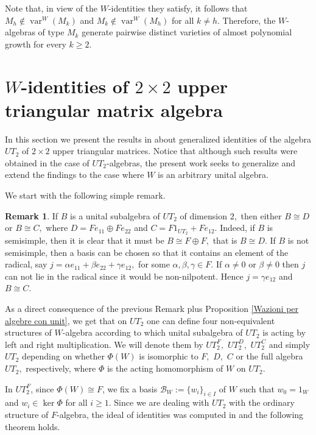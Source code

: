 \documentclass[reqno]{amsart}
\theoremstyle{definition}
\newtheorem{remark}[theorem]{Remark}
\numberwithin{equation}{section}
\numberwithin{theorem}{section}
\DeclareMathOperator{\V}{var}
\begin{document}
Note that, in view of the $W$-identities they satisfy, it follows that $M_h\notin\V^W(M_k)$ and $M_k\notin\V^W(M_h)$ for all $k\neq h.$ Therefore, the $W$-algebras of type $M_k$ generate pairwise distinct varieties of almost polynomial growth for every $k\geq 2.$


\section{$W$-identities of $2\times 2$ upper triangular matrix algebra}
In this section we present the results in \cite{MartinoRizzo2024} about generalized identities of the algebra $UT_2$ of $2 \times 2$ upper triangular matrices. Notice that although such results were obtained in the case of $UT_2$-algebras, the present work seeks to generalize and extend the findings to the case where $W$ is an arbitrary unital algebra. 

We start with the following simple remark.

\begin{remark}\label{sottoalgebre di dimensione 2}
If $B$ is a unital subalgebra of $UT_2$ of dimension $2,$ then either $B\cong D$ or $B\cong C,$ where $D=Fe_{11}\oplus Fe_{22}$ and $C=F 1_{UT_2}+ Fe_{12}.$ Indeed, if $B$ is semisimple, then it is clear that it must be $B\cong F\oplus F,$ that is $B\cong D.$ If $B$ is not semisimple, then a basis can be chosen so that it contains an element of the radical, say $j=\alpha e_{11}+\beta e_{22}+\gamma e_{12},$ for some $\alpha,\beta,\gamma\in F.$ If $\alpha\neq 0$ or $\beta\neq 0$ then $j$ can not lie in the radical since it would be non-nilpotent. Hence $j=\gamma e_{12}$ and $B\cong C.$
\end{remark}

As a direct consequence of the previous Remark plus Proposition \ref{Wazioni per algebre con unit}, we get that on $UT_2$ one can define four non-equivalent structures of $W$-algebra according to which unital subalgebra of $UT_2$ is acting by left and right multiplication. We will denote them by $UT_2^F,$ $UT_2^D,$ $UT_2^C$ and simply $UT_2$ depending on whether $\Phi(W)$ is isomorphic to $F,$ $D,$ $C$ or the full algebra $UT_2,$ respectively, where $\Phi$ is the acting homomorphism of $W$ on $UT_2$.

  In $UT_2^F$, since $\Phi(W)\cong F$, we fix a basis $\mathcal{B}_W:=\{w_i\}_{i\in I}$  of $W$ such that $w_0=1_W$ and $w_i\in \ker \Phi$ for all $i \geq 1$. Since we are dealing with $UT_2$ with the ordinary structure of $F$-algebra, the ideal of identities was computed in \cite{Malcev1971} and the following theorem holds.
\end{document}
